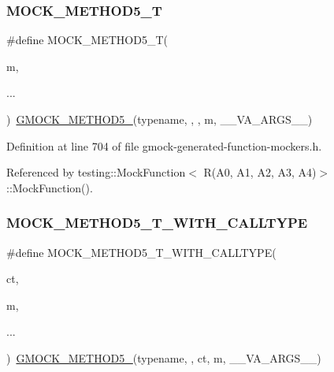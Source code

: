 \subsubsection{\texorpdfstring{M\+O\+C\+K\+\_\+\+M\+E\+T\+H\+O\+D5\+\_\+T}{MOCK\_METHOD5\_T}}
{\footnotesize\ttfamily \#define M\+O\+C\+K\+\_\+\+M\+E\+T\+H\+O\+D5\+\_\+T(\begin{DoxyParamCaption}\item[{}]{m,  }\item[{}]{... }\end{DoxyParamCaption})~\hyperlink{gmock-generated-function-mockers_8h_a9e3ecd392499ab19a4a6d3adcabf56f6}{G\+M\+O\+C\+K\+\_\+\+M\+E\+T\+H\+O\+D5\+\_\+}(typename, , , m, \+\_\+\+\_\+\+V\+A\+\_\+\+A\+R\+G\+S\+\_\+\+\_\+)}



Definition at line 704 of file gmock-\/generated-\/function-\/mockers.\+h.



Referenced by testing\+::\+Mock\+Function$<$ R(\+A0, A1, A2, A3, A4)$>$\+::\+Mock\+Function().

\mbox{\label{gmock-generated-function-mockers_8h_a04f83b372ebe63dea92cb5c3502ff345}} 
\subsubsection{\texorpdfstring{M\+O\+C\+K\+\_\+\+M\+E\+T\+H\+O\+D5\+\_\+\+T\+\_\+\+W\+I\+T\+H\+\_\+\+C\+A\+L\+L\+T\+Y\+PE}{MOCK\_METHOD5\_T\_WITH\_CALLTYPE}}
{\footnotesize\ttfamily \#define M\+O\+C\+K\+\_\+\+M\+E\+T\+H\+O\+D5\+\_\+\+T\+\_\+\+W\+I\+T\+H\+\_\+\+C\+A\+L\+L\+T\+Y\+PE(\begin{DoxyParamCaption}\item[{}]{ct,  }\item[{}]{m,  }\item[{}]{... }\end{DoxyParamCaption})~\hyperlink{gmock-generated-function-mockers_8h_a9e3ecd392499ab19a4a6d3adcabf56f6}{G\+M\+O\+C\+K\+\_\+\+M\+E\+T\+H\+O\+D5\+\_\+}(typename, , ct, m, \+\_\+\+\_\+\+V\+A\+\_\+\+A\+R\+G\+S\+\_\+\+\_\+)}



